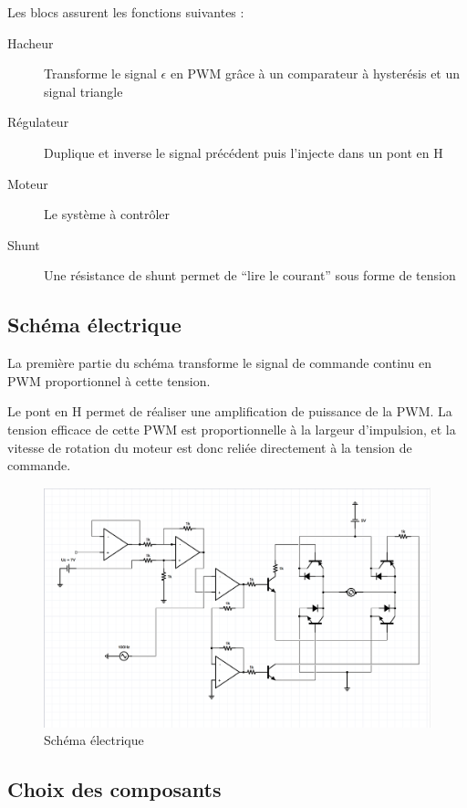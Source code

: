 \documentclass[a4paper]{article}
\begin{document}
Les blocs assurent les fonctions suivantes :
\begin{description}
  \item[Hacheur] 	Transforme le signal $\epsilon$ en PWM grâce à un comparateur à hysterésis et un signal triangle
  \item[Régulateur] Duplique et inverse le signal précédent puis l'injecte dans un pont en H
  \item[Moteur] 	Le système à contrôler
  \item[Shunt] 		Une résistance de shunt permet de “lire le courant” sous forme de tension
\end{description}

\subsection{Schéma électrique}

La première partie du schéma transforme le signal de commande continu en PWM proportionnel à cette tension.

Le pont en H permet de réaliser une amplification de puissance de la PWM. La tension efficace de cette PWM est proportionnelle à la largeur d'impulsion, et la vitesse de rotation du moteur est donc reliée directement à la tension de commande.

\begin{figure}[h!]
\centering
	\includegraphics[width=1\textwidth]{schema}
	\caption{Schéma électrique}
\end{figure}


\subsection{Choix des composants}
\end{document}
